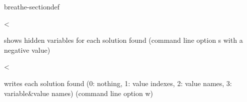 \documentclass[letterpaper,10pt,openany,oneside,english]{sphinxmanual}
\begin{document}
\begin{fulllineitems}
\begin{sphinxuseclass}{breathe-sectiondef}

\begin{fulllineitems}
\label{\detokenize{ref/ref_cpp:_CPPv4N8ToulBar213writeSolutionE}}\label{\detokenize{ref/ref_cpp:_CPPv3N8ToulBar213writeSolutionE}}\label{\detokenize{ref/ref_cpp:_CPPv2N8ToulBar213writeSolutionE}}\label{\detokenize{ref/ref_cpp:ToulBar2::writeSolution__i}}
\pysigstartsignatures
\pysigstartmultiline
{}
\pysigstopmultiline
\pysigstopsignatures
\sphinxAtStartPar
\textless{} 

\sphinxAtStartPar
shows hidden variables for each solution found (command line option \sphinxhyphen{}s with a negative value) 

\end{fulllineitems}


\begin{fulllineitems}
\label{\detokenize{ref/ref_cpp:_CPPv4N8ToulBar212solutionFileE}}\label{\detokenize{ref/ref_cpp:_CPPv3N8ToulBar212solutionFileE}}\label{\detokenize{ref/ref_cpp:_CPPv2N8ToulBar212solutionFileE}}\label{\detokenize{ref/ref_cpp:ToulBar2::solutionFile__FILEP}}
\pysigstartsignatures
\pysigstartmultiline
{}
\pysigstopmultiline
\pysigstopsignatures
\sphinxAtStartPar
\textless{} 

\sphinxAtStartPar
writes each solution found (0: nothing, 1: value indexes, 2: value names, 3: variable\&value names) (command line option \sphinxhyphen{}w) 

\end{fulllineitems}



\end{sphinxuseclass}
\end{fulllineitems}
\end{document}
